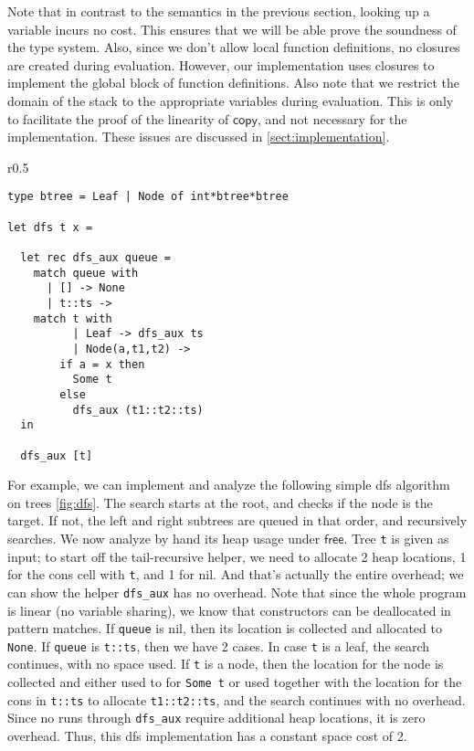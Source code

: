 \documentclass{easychair}
\newcommand{\ms}[1]{\ensuremath{\mathsf{#1}}}
\theoremstyle{definition}
\begin{document}
Note that in contrast to the semantics in the previous section, looking up a variable incurs no
cost. This ensures that we will be able prove the soundness of the type system. 
Also, since we don't allow local function definitions, no closures are created 
during evaluation. However, our implementation uses closures to implement the global block of 
function definitions. Also note that we restrict the domain of the stack to the appropriate
variables during evaluation. This is only to facilitate the proof of the linearity of $\ms{copy}$, 
and not necessary for the implementation. These issues are discussed in \ref{sect:implementation}.

\begin{wrapfigure}{r}{0.5\textwidth}
	\vspace{-20pt}
		\begin{center}
\begin{verbatim}
type btree = Leaf | Node of int*btree*btree

let dfs t x =

  let rec dfs_aux queue =
    match queue with
      | [] -> None
      | t::ts -> 
	match t with
          | Leaf -> dfs_aux ts
          | Node(a,t1,t2) -> 
	    if a = x then 
	      Some t 
	    else 
	      dfs_aux (t1::t2::ts)
  in

  dfs_aux [t]
\end{verbatim}
			\end{center}
				\vspace{-20pt}
			\caption{dfs algorithm}
		\vspace{-10pt}
\label{fig:dfs}
\end{wrapfigure}


For example, we can implement and analyze the following simple dfs algorithm on trees 
\ref{fig:dfs}.
The search starts at the root, and checks if the node is the target. If not, 
the left and right subtrees are queued in that order, and recursively searches.
We now analyze by hand its heap usage under $\ms{free}$. Tree \texttt{t} is given 
as input; to start off the tail-recursive helper, we need to allocate 2 heap locations,
1 for the cons cell with \texttt{t}, and 1 for nil. And that's actually the entire overhead; 
we can show the helper \texttt{dfs\_aux} has no overhead. Note that since the whole program is 
linear (no variable sharing), we know that constructors can be deallocated in pattern matches. 
If \texttt{queue} is nil, then its location is collected and allocated to \texttt{None}.
If \texttt{queue} is \texttt{t::ts}, then we have 2 cases. In case \texttt{t} is a leaf, 
the search continues, with no space used. If \texttt{t} is a node, then the location for the node
is collected and either used to for \texttt{Some t} or used together with the location for 
the cons in \texttt{t::ts} to allocate \texttt{t1::t2::ts}, and the search continues with
no overhead. Since no runs through \texttt{dfs\_aux} require additional heap locations, 
it is zero overhead. Thus, this dfs implementation has a constant space cost of 2.
\end{document}
